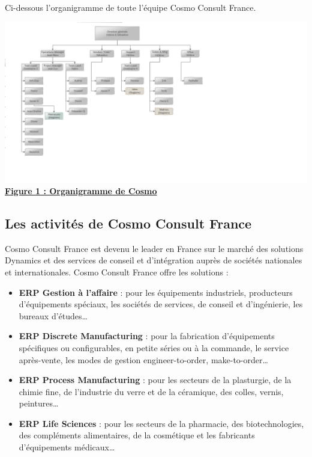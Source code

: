 \documentclass[12pt]{article}
\begin{document}
Ci-dessous l'organigramme de toute l'équipe Cosmo Consult France.
\begin{center}
\includegraphics[scale=0.5]{images/figure1.png}
\underline{\textbf{Figure 1 : Organigramme de Cosmo}}
\end{center}

	\subsection{Les activités de Cosmo Consult France}
\hspace{1cm} Cosmo Consult France est devenu le leader en France sur le marché des solutions Dynamics et des services de conseil et d'intégration auprès de sociétés nationales et internationales. Cosmo Consult France offre les solutions : 
\begin{itemize}
	\item\textbf{ ERP Gestion à l'affaire} : pour les équipements industriels, producteurs d'équipements spéciaux, les sociétés de services, de conseil et d'ingénierie, les bureaux d'études…
	
	\item \textbf{ERP Discrete Manufacturing} : pour la fabrication d'équipements spécifiques ou configurables, en petite séries ou à la commande, le service après-vente, les modes de gestion engineer-to-order, make-to-order…
	
	\item \textbf{ERP Process Manufacturing} : pour les secteurs de la plasturgie, de la chimie fine, de l'industrie du verre et de la céramique, des colles, vernis, peintures…
	
	\item \textbf{ERP Life Sciences} : pour les secteurs de la pharmacie, des biotechnologies, des compléments alimentaires, de la cosmétique et les fabricants d'équipements médicaux…
	
\end{itemize}
\end{document}
